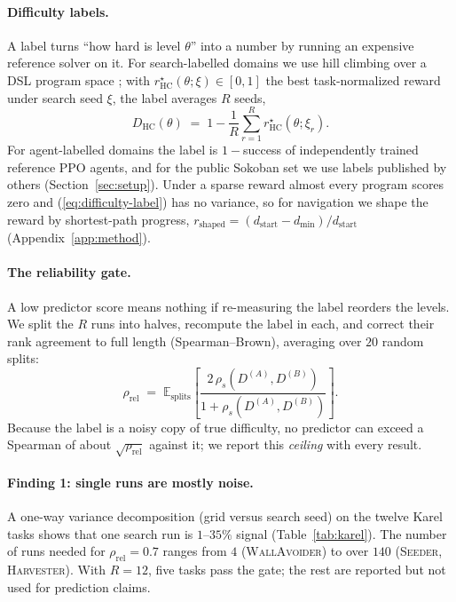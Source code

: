 \documentclass[twoside]{article}
\newcommand{\E}{\mathbb{E}}
\begin{document}
\paragraph{Difficulty labels.}
\label{sec:difficulty-label}
A label turns ``how hard is level $\theta$'' into a number by running an expensive reference solver on it. For search-labelled domains we use hill climbing over a DSL program space \citep{trivedi2021learning, carvalho2024reclaiming}; with $r^\star_{\mathrm{HC}}(\theta;\xi)\in[0,1]$ the best task-normalized reward under search seed $\xi$, the label averages $R$ seeds,
\begin{equation}
    D_{\mathrm{HC}}(\theta) \;=\; 1 - \frac{1}{R}\sum_{r=1}^{R} r^\star_{\mathrm{HC}}(\theta; \xi_r).
    \label{eq:difficulty-label}
\end{equation}
For agent-labelled domains the label is $1-$success of independently trained reference PPO agents, and for the public Sokoban set we use labels published by others (Section~\ref{sec:setup}). Under a sparse reward almost every program scores zero and (\ref{eq:difficulty-label}) has no variance, so for navigation we shape the reward by shortest-path progress, $r_{\mathrm{shaped}} = (d_{\mathrm{start}} - d_{\min})/d_{\mathrm{start}}$ (Appendix~\ref{app:method}).
\label{sec:shaping}

\paragraph{The reliability gate.} A low predictor score means nothing if re-measuring the label reorders the levels. We split the $R$ runs into halves, recompute the label in each, and correct their rank agreement to full length (Spearman--Brown), averaging over $20$ random splits:
\begin{equation}
    \rho_{\mathrm{rel}} \;=\; \E_{\text{splits}}\!\left[\frac{2\,\rho_s(D^{(A)}, D^{(B)})}{1 + \rho_s(D^{(A)}, D^{(B)})}\right].
    \label{eq:reliability}
\end{equation}
Because the label is a noisy copy of true difficulty, no predictor can exceed a Spearman of about $\sqrt{\rho_{\mathrm{rel}}}$ against it; we report this \emph{ceiling} with every result.

\paragraph{Finding 1: single runs are mostly noise.} A one-way variance decomposition (grid versus search seed) on the twelve Karel tasks shows that one search run is $1$--$35\%$ signal (Table~\ref{tab:karel}). The number of runs needed for $\rho_{\mathrm{rel}}=0.7$ ranges from $4$ (\textsc{WallAvoider}) to over $140$ (\textsc{Seeder}, \textsc{Harvester}). With $R=12$, five tasks pass the gate; the rest are reported but not used for prediction claims.
\end{document}
